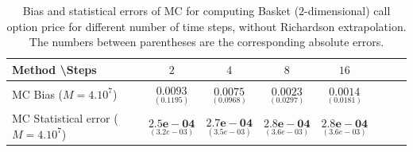 \begin{table}[h!]
	\centering
	\begin{tabular}{l*{6}{c}r}
		Method \textbackslash  Steps            & $2$ & $4$ & $8$ & $16$  \\
		\hline
		MC Bias ($M=4.10^{7}$)  & 	$ \underset{(      0.1195
			 )}{\mathbf{0.0093}}$  & $\underset{(0.0968
			 )}{\mathbf{ 0.0075
		}}$  & $\underset{(  0.0297)}{\mathbf{0.0023}}$ & $\underset{(         0.0181
	
			)}{\mathbf{  0.0014 }}$\\ 
		
		MC Statistical error  ($M=4.10^{7}$)   & 	$ \underset{( 3.2e-03  )}{\mathbf{2.5e-04}}$  & $\underset{(3.5e-03 )}{\mathbf{ 2.7e-04
		}}$  & $\underset{(3.6e-03 )}{\mathbf{2.8e-04}}$ & $\underset{( 3.6e-03 )}{\mathbf{ 2.8e-04  }}$\\ 
		\hline
	\end{tabular}
	\caption{Bias and statistical errors of MC  for computing Basket ($2$-dimensional) call option price  for different number of time steps, without Richardson extrapolation. The numbers between parentheses are the corresponding absolute errors.}
	\label{Bias and Statistical errors of MC  for computing Basket 2d Call option price  for different number of time steps, without Richardson extrapolation. The numbers between parentheses are the corresponding absolute errors.}
\end{table}



